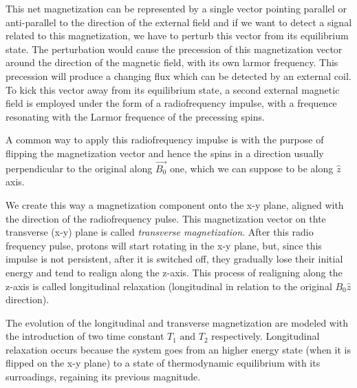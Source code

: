 \documentclass[10pt]{report}
\begin{document}
This net magnetization can be represented by a single vector pointing parallel or anti-parallel to the direction of the external field and if we want to detect a signal related to this magnetization, we have to perturb this vector from its equilibrium state.
The perturbation would cause the precession of this magnetization vector around the direction of the magnetic field, with its own larmor frequency.
This precession will produce a changing flux which can be detected by an external coil.
To kick this vector away from its equilibrium state, a second external magnetic field is employed under the form of a radiofrequency impulse, with a frequence resonating with the Larmor frequence of the precessing spins.

A common way to apply this radiofrequency impulse is with the purpose of flipping the magnetization vector and hence the spins in a direction usually perpendicular to the original along $\overrightarrow{B_0}$ one, which we can suppose to be along $\hat z$ axis.

We create this way a magnetization component onto the x-y plane, aligned with the direction of the radiofrequency pulse.
This magnetization vector on thte transverse (x-y) plane is called \emph{transverse magnetization}.
After this radio frequency pulse, protons will start rotating in the x-y plane, but, since this impulse is not persistent, after it is switched off, they gradually lose their initial energy and tend to realign along the z-axis.
This process of realigning along the z-axis is called longitudinal relaxation (longitudinal in relation to the original $B_0 \hat z$ direction).

The evolution of the longitudinal and transverse magnetization are modeled with the introduction of two time constant $T_1 \text{ and } T_2$ respectively.
Longitudinal relaxation occurs because the system goes from an higher energy state (when it is flipped on the x-y plane) to a state of thermodynamic equilibrium with its surroadings, regaining its previous magnitude.
\end{document}

